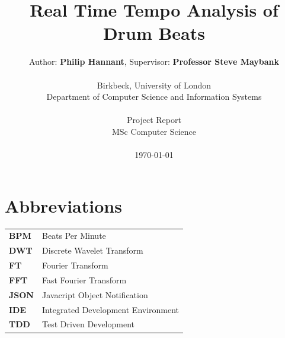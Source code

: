 \documentclass[a4paper, 11pt]{article}
\date{}
\begin{document}
 

\LARGE\title{Real Time Tempo Analysis of Drum Beats}

\LARGE\author{Author: \textbf{Philip Hannant}, Supervisor: \textbf{Professor Steve Maybank}\\
\\Birkbeck, University of London\\
Department of Computer Science and Information Systems\\
\\Project Report\\
MSc Computer Science\\
\\\monthyeardate\today
}





\normalsize


\maketitle
\newpage
\tableofcontents
\clearpage

\section*{Abbreviations}
\begin{tabular}{l p{4.5in}  }\\
\textbf{BPM} & Beats Per Minute\\
\textbf{DWT} & Discrete Wavelet Transform\\
\textbf{FT} & Fourier Transform\\
\textbf{FFT} & Fast Fourier Transform\\
\textbf{JSON} & Javacript Object Notification\\
\textbf{IDE} & Integrated Development Environment\\
\textbf{TDD} & Test Driven Development\\
\end{tabular}
\end{document}
